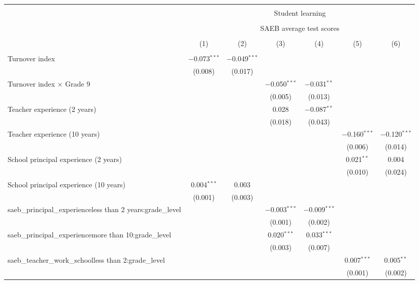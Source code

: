 
\begingroup 
\small 
\begin{tabular}{@{\extracolsep{5pt}}lcccccc} 
\\[-1.8ex]\hline 
\hline \\[-1.8ex] 
 & \multicolumn{6}{c}{Student learning} \\ 
\cline{2-7} 
\\[-1.8ex] & \multicolumn{6}{c}{SAEB average test scores} \\ 
\\[-1.8ex] & (1) & (2) & (3) & (4) & (5) & (6)\\ 
\hline \\[-1.8ex] 
 Turnover index & $-$0.073$^{***}$ & $-$0.049$^{***}$ &  &  &  &  \\ 
  & (0.008) & (0.017) &  &  &  &  \\ 
  Turnover index $\times$ Grade 9 &  &  & $-$0.050$^{***}$ & $-$0.031$^{**}$ &  &  \\ 
  &  &  & (0.005) & (0.013) &  &  \\ 
  Teacher experience (2 years) &  &  & 0.028 & $-$0.087$^{**}$ &  &  \\ 
  &  &  & (0.018) & (0.043) &  &  \\ 
  Teacher experience (10 years) &  &  &  &  & $-$0.160$^{***}$ & $-$0.120$^{***}$ \\ 
  &  &  &  &  & (0.006) & (0.014) \\ 
  School principal experience (2 years) &  &  &  &  & 0.021$^{**}$ & 0.004 \\ 
  &  &  &  &  & (0.010) & (0.024) \\ 
  School principal experience (10 years) & 0.004$^{***}$ & 0.003 &  &  &  &  \\ 
  & (0.001) & (0.003) &  &  &  &  \\ 
  saeb\_principal\_experienceless than 2 years:grade\_level &  &  & $-$0.003$^{***}$ & $-$0.009$^{***}$ &  &  \\ 
  &  &  & (0.001) & (0.002) &  &  \\ 
  saeb\_principal\_experiencemore than 10:grade\_level &  &  & 0.020$^{***}$ & 0.033$^{***}$ &  &  \\ 
  &  &  & (0.003) & (0.007) &  &  \\ 
  saeb\_teacher\_work\_schoolless than 2:grade\_level &  &  &  &  & 0.007$^{***}$ & 0.005$^{**}$ \\ 
  &  &  &  &  & (0.001) & (0.002) \\ 

\end{tabular}
